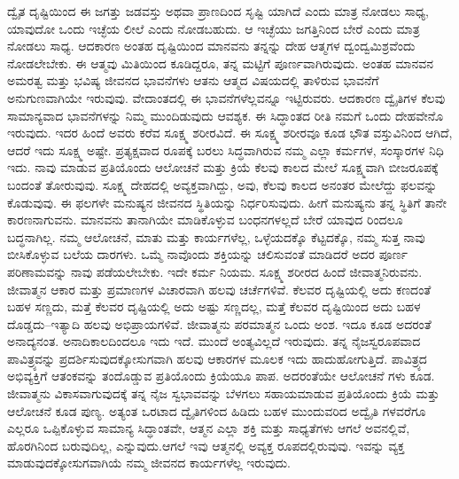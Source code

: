 ದ್ವೈತ ದೃಷ್ಟಿಯಿಂದ ಈ ಜಗತ್ತು ಜಡವಸ್ತು ಅಥವಾ ಪ್ರಾಣದಿಂದ ಸೃಷ್ಟಿ ಯಾಗಿದೆ ಎಂದು ಮಾತ್ರ ನೋಡಲು ಸಾಧ್ಯ, ಯಾವುದೋ ಒಂದು ಇಚ್ಛೆಯ ಲೀಲೆ ಎಂದು ನೋಡಬಹುದು. ಆ ಇಚ್ಛೆಯು ಜಗತ್ತಿನಿಂದ ಬೇರೆ ಎಂದು ಮಾತ್ರ ನೋಡಲು ಸಾಧ್ಯ. ಆದಕಾರಣ ಅಂತಹ ದೃಷ್ಟಿಯಿಂದ ಮಾನವನು ತನ್ನನ್ನು ದೇಹ ಆತ್ಮಗಳ ದ್ವಂದ್ವಮಿಶ್ರವೆಂದು ನೋಡಲೇಬೇಕು. ಈ ಆತ್ಮವು ಮಿತಿಯಿಂದ ಕೂಡಿದ್ದರೂ, ತನ್ನ ಮಟ್ಟಿಗೆ ಪೂರ್ಣವಾಗಿರುವುದು. ಅಂತಹ ಮಾನವನ ಅಮರತ್ವ ಮತ್ತು ಭವಿಷ್ಯ ಜೀವನದ ಭಾವನೆಗಳು ಆತನು ಆತ್ಮದ ವಿಷಯದಲ್ಲಿ ತಾಳಿರುವ ಭಾವನೆಗೆ ಅನುಗುಣವಾಗಿಯೇ ಇರುವುವು. ವೇದಾಂತದಲ್ಲಿ ಈ ಭಾವನೆಗಳೆಲ್ಲವನ್ನೂ ಇಟ್ಟಿರುವರು. ಆದಕಾರಣ ದ್ವೈತಿಗಳ ಕೆಲವು ಸಾಮಾನ್ಯವಾದ ಭಾವನೆಗಳನ್ನು ನಿಮ್ಮ ಮುಂದಿಡುವುದು ಆವಶ್ಯಕ. ಈ ಸಿದ್ಧಾಂತದ ರೀತಿ ನಮಗೆ ಒಂದು ದೇಹವೇನೊ ಇರುವುದು. ಇದರ ಹಿಂದೆ ಅವರು ಕರೆವ ಸೂಕ್ಷ್ಮ ಶರೀರವಿದೆ. ಈ ಸೂಕ್ಷ್ಮ ಶರೀರವೂ ಕೂಡ ಭೌತ ವಸ್ತುವಿನಿಂದ ಆಗಿದೆ, ಆದರೆ ಇದು ಸೂಕ್ಷ್ಮ ಅಷ್ಟೇ. ಪ್ರತ್ಯಕ್ಷವಾದ ರೂಪಕ್ಕೆ ಬರಲು ಸಿದ್ಧವಾಗಿರುವ ನಮ್ಮ ಎಲ್ಲಾ ಕರ್ಮಗಳ, ಸಂಸ್ಕಾರಗಳ ನಿಧಿ ಇದು. ನಾವು ಮಾಡುವ ಪ್ರತಿಯೊಂದು ಆಲೋಚನೆ ಮತ್ತು ಕ್ರಿಯೆ ಕೆಲವು ಕಾಲದ ಮೇಲೆ ಸೂಕ್ಷ್ಮವಾಗಿ ಬೀಜರೂಪಕ್ಕೆ ಬಂದಂತೆ ತೋರುವುವು. ಸೂಕ್ಷ್ಮ ದೇಹದಲ್ಲಿ ಅವ್ಯಕ್ತವಾಗಿದ್ದು, ಅವು, ಕೆಲವು ಕಾಲದ ಅನಂತರ ಮೇಲೆದ್ದು ಫಲವನ್ನು ಕೊಡುವುವು. ಈ ಫಲಗಳೇ ಮನುಷ್ಯನ ಜೀವನದ ಸ್ಥಿತಿಯನ್ನು ನಿರ್ಧರಿಸುವುದು. ಹೀಗೆ ಮನುಷ್ಯನು ತನ್ನ ಸ್ಥಿತಿಗೆ ತಾನೇ ಕಾರಣನಾಗುವನು. ಮಾನವನು ತಾನಾಗಿಯೇ ಮಾಡಿಕೊಳ್ಳುವ ಬಂಧನಗಳಲ್ಲದೆ ಬೇರೆ ಯಾವುದ ರಿಂದಲೂ ಬದ್ಧನಾಗಿಲ್ಲ. ನಮ್ಮ ಆಲೋಚನೆ, ಮಾತು ಮತ್ತು ಕಾರ್ಯಗಳೆಲ್ಲ, ಒಳ್ಳೆಯದಕ್ಕೊ ಕೆಟ್ಟದಕ್ಕೊ, ನಮ್ಮ ಸುತ್ತ ನಾವು ಬೀಸಿಕೊಳ್ಳುವ ಬಲೆಯ ದಾರಗಳು. ಒಮ್ಮೆ ನಾವೊಂದು ಶಕ್ತಿಯನ್ನು ಚಲಿಸುವಂತೆ ಮಾಡಿದರೆ ಅದರ ಪೂರ್ಣ ಪರಿಣಾಮವನ್ನು ನಾವು ಪಡೆಯಲೇಬೇಕು. ಇದೇ ಕರ್ಮ ನಿಯಮ. ಸೂಕ್ಷ್ಮ ಶರೀರದ ಹಿಂದೆ ಜೀವಾತ್ಮನಿರುವನು. ಜೀವಾತ್ಮನ ಆಕಾರ ಮತ್ತು ಪ್ರಮಾಣಗಳ ವಿಚಾರವಾಗಿ ಹಲವು ಚರ್ಚೆಗಳಿವೆ. ಕೆಲವರ ದೃಷ್ಟಿಯಲ್ಲಿ ಅದು ಕಣದಂತೆ ಬಹಳ ಸಣ್ಣದು, ಮತ್ತೆ ಕೆಲವರ ದೃಷ್ಟಿಯಲ್ಲಿ ಅದು ಅಷ್ಟು ಸಣ್ಣದಲ್ಲ, ಮತ್ತೆ ಕೆಲವರ ದೃಷ್ಟಿಯಿಂದ ಅದು ಬಹಳ ದೊಡ್ಡದು–ಇತ್ಯಾದಿ ಹಲವು ಅಭಿಪ್ರಾಯಗಳಿವೆ. ಜೀವಾತ್ಮನು ಪರಮಾತ್ಮನ ಒಂದು ಅಂಶ. ಇದೂ ಕೂಡ ಅದರಂತೆ ಅನಾದ್ಯನಂತ. ಅನಾದಿಕಾಲದಿಂದಲೂ ಇದು ಇದೆ. ಮುಂದೆ ಅಂತ್ಯವಿಲ್ಲದೆ ಇರುವುದು. ತನ್ನ ನೈಜಸ್ವರೂಪವಾದ ಪಾವಿತ್ರ್ಯವನ್ನು ಪ್ರದರ್ಶಿಸುವುದಕ್ಕೋಸುಗವಾಗಿ ಹಲವು ಆಕಾರಗಳ ಮೂಲಕ ಇದು ಹಾದುಹೋಗುತ್ತಿದೆ. ಪಾವಿತ್ರ್ಯದ ಅಭಿವ್ಯಕ್ತಿಗೆ ಆತಂಕವನ್ನು ತಂದೊಡ್ಡುವ ಪ್ರತಿಯೊಂದು ಕ್ರಿಯೆಯೂ ಪಾಪ. ಅದರಂತೆಯೇ ಆಲೋಚನೆ ಗಳು ಕೂಡ. ಜೀವಾತ್ಮನು ವಿಕಾಸವಾಗುವುದಕ್ಕೆ ತನ್ನ ನೈಜ ಸ್ವಭಾವವನ್ನು ಬೆಳಗಲು ಸಹಾಯಮಾಡುವ ಪ್ರತಿಯೊಂದು ಕ್ರಿಯೆ ಮತ್ತು ಆಲೋಚನೆ ಕೂಡ ಪುಣ್ಯ. ಅತ್ಯಂತ ಒರಟಾದ ದ್ವೈತಿಗಳಿಂದ ಹಿಡಿದು ಬಹಳ ಮುಂದುವರಿದ ಅದ್ವೈತಿ ಗಳವರೆಗೂ ಎಲ್ಲರೂ ಒಪ್ಪಿಕೊಳ್ಳುವ ಸಾಮಾನ್ಯ ಸಿದ್ಧಾಂತವೇ, ಆತ್ಮನ ಎಲ್ಲಾ ಶಕ್ತಿ ಮತ್ತು ಸಾಧ್ಯತೆಗಳು ಆಗಲೆ ಅವನಲ್ಲಿವೆ, ಹೊರಗಿನಿಂದ ಬರುವುದಿಲ್ಲ, ಎನ್ನುವುದು.ಆಗಲೆ ಇವು ಆತ್ಮನಲ್ಲಿ ಅವ್ಯಕ್ತ ರೂಪದಲ್ಲಿರುವುವು. ಇವನ್ನು ವ್ಯಕ್ತ ಮಾಡುವುದಕ್ಕೋಸುಗವಾಗಿಯೆ ನಮ್ಮ ಜೀವನದ ಕಾರ್ಯಗಳೆಲ್ಲ ಇರುವುದು.


